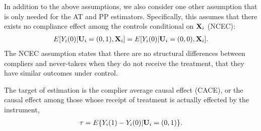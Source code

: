 \documentclass{article}
\newtheorem{assumption}{Assumption}
\begin{document}
In addition to the above assumptions, we also consider one other assumption that is only needed for the AT and PP estimators. Specifically, this assumes that there exists no compliance effect among the controls conditional on ${\bf X}_i$ (NCEC):
\begin{align}
    E[Y_i(0) | {\bf U}_i = (0, 1), {\bf X}_i] = E[Y_i(0) | {\bf U}_i = (0, 0), {\bf X}_i]. \label{ncec}
\end{align}
The NCEC assumption states that there are no structural differences between compliers and never-takers when they do not receive the treatment, that they have similar outcomes under control. 


The target of estimation is the complier average causal effect (CACE), or the causal effect among those whose receipt of treatment is actually effected by the instrument,
\begin{align}
\tau = E\{Y_i(1) - Y_i(0) | {\bf U}_i = (0,1)\}. \label{cace}
\end{align}





\end{document}

